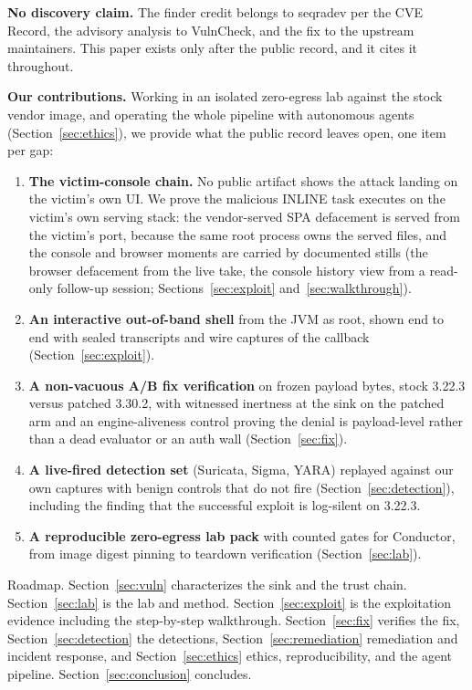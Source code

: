 \documentclass[journal]{IEEEtran}
\begin{document}
\textbf{No discovery claim.} The finder credit belongs to seqradev per the CVE
Record, the advisory analysis to VulnCheck, and the fix to the upstream
maintainers. This paper exists only after the public record, and it cites it
throughout.

\textbf{Our contributions.} Working in an isolated zero-egress lab against the
stock vendor image, and operating the whole pipeline with autonomous agents
(Section~\ref{sec:ethics}), we provide what the public record leaves open, one
item per gap:
\begin{enumerate}
\item \textbf{The victim-console chain.} No public artifact shows the attack
landing on the victim's own UI. We prove the malicious INLINE task executes on
the victim's own serving stack: the vendor-served SPA defacement is served
from the victim's port, because the same root process owns the served files,
and the console and browser moments are carried by documented stills (the
browser defacement from the live take, the console history view from a
read-only follow-up session; Sections~\ref{sec:exploit}
and~\ref{sec:walkthrough}).
\item \textbf{An interactive out-of-band shell} from the JVM as root, shown
end to end with sealed transcripts and wire captures of the callback
(Section~\ref{sec:exploit}).
\item \textbf{A non-vacuous A/B fix verification} on frozen payload bytes,
stock 3.22.3 versus patched 3.30.2, with witnessed inertness at the sink on
the patched arm and an engine-aliveness control proving the denial is
payload-level rather than a dead evaluator or an auth wall
(Section~\ref{sec:fix}).
\item \textbf{A live-fired detection set} (Suricata, Sigma, YARA) replayed
against our own captures with benign controls that do not fire
(Section~\ref{sec:detection}), including the finding that the successful
exploit is log-silent on 3.22.3.
\item \textbf{A reproducible zero-egress lab pack} with counted gates for
Conductor, from image digest pinning to teardown verification
(Section~\ref{sec:lab}).
\end{enumerate}

Roadmap. Section~\ref{sec:vuln} characterizes the sink and the trust chain.
Section~\ref{sec:lab} is the lab and method. Section~\ref{sec:exploit} is the
exploitation evidence including the step-by-step walkthrough.
Section~\ref{sec:fix} verifies the fix, Section~\ref{sec:detection} the
detections, Section~\ref{sec:remediation} remediation and incident response,
and Section~\ref{sec:ethics} ethics, reproducibility, and the agent pipeline.
Section~\ref{sec:conclusion} concludes.
\end{document}
